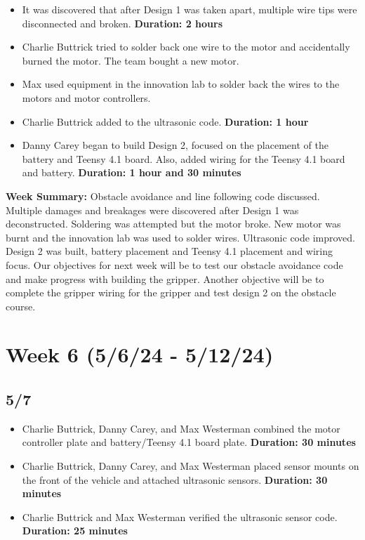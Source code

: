 \documentclass[12pt]{report}
\begin{document}
\begin{itemize}
    \item It was discovered that after Design 1 was taken apart, multiple wire tips were disconnected and broken. \textbf{Duration: 2 hours}
    \item Charlie Buttrick tried to solder back one wire to the motor and accidentally burned the motor. The team bought a new motor.
    \item Max used equipment in the innovation lab to solder back the wires to the motors and motor controllers.
    \item Charlie Buttrick added to the ultrasonic code. \textbf{Duration: 1 hour}
    \item Danny Carey began to build Design 2, focused on the placement of the battery and Teensy 4.1 board. Also, added wiring for the Teensy 4.1 board and battery. \textbf{Duration: 1 hour and 30 minutes}
\end{itemize}

\textbf{Week Summary:} Obstacle avoidance and line following code discussed. Multiple damages and breakages were discovered after Design 1 was deconstructed. Soldering was attempted but the motor broke. New motor was burnt and the innovation lab was used to solder wires. Ultrasonic code improved. Design 2 was built, battery placement and Teensy 4.1 placement and wiring focus. Our objectives for next week will be to test our obstacle avoidance code and make progress with building the gripper. Another objective will be to complete the gripper wiring for the gripper and test design 2 on the obstacle course.

\section{Week 6 (5/6/24 - 5/12/24)}
\subsection*{5/7}

\begin{itemize}
    \item Charlie Buttrick, Danny Carey, and Max Westerman combined the motor controller plate and battery/Teensy 4.1 board plate. \textbf{Duration: 30 minutes}
    \item Charlie Buttrick, Danny Carey, and Max Westerman placed sensor mounts on the front of the vehicle and attached ultrasonic sensors. \textbf{Duration: 30 minutes}
    \item Charlie Buttrick and Max Westerman verified the ultrasonic sensor code. \textbf{Duration: 25 minutes}
\end{itemize}
\end{document}
